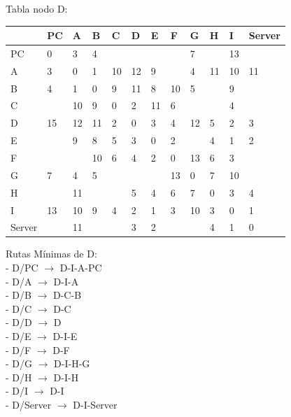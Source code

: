 \documentclass[a4paper]{article}
\begin{document}
\begin{table}[ht]
Tabla nodo D:\\
\begin{tabular}{|l|l|l|l|l|l|l|l|l|l|l|l|}
\hline
       & PC & A  & B & C & D & E & F & G & H & I  & Server \\ \hline
PC     & 0  & 3  & 4 &   &   &   &   & 7 &   & 13 &        \\ \hline
A      & 3  & 0  & 1 & 10& 12& 9 &   & 4 & 11& 10 & 11     \\ \hline
B      & 4  & 1  & 0 & 9 & 11& 8 & 10& 5 &   & 9  &        \\ \hline
C      &    & 10 & 9 & 0 & 2 & 11& 6 &   &   & 4  &        \\ \hline
D      & 15 & 12 & 11& 2 & 0 & 3 & 4 & 12& 5 & 2  & 3      \\ \hline
E      &    & 9  & 8 & 5 & 3 & 0 & 2 &   & 4 & 1  & 2      \\ \hline
F      &    &    & 10& 6 & 4 & 2 & 0 & 13& 6 & 3  &        \\ \hline
G      & 7  & 4  & 5 &   &   &   & 13& 0 & 7 & 10 &        \\ \hline
H      &    & 11 &   &   & 5 & 4 & 6 & 7 & 0 & 3  & 4      \\ \hline
I      & 13 & 10 & 9 & 4 & 2 & 1 & 3 & 10& 3 & 0  & 1      \\ \hline
Server &    & 11 &   &   & 3 & 2 &   &   & 4 & 1  & 0      \\ \hline
\end{tabular}

Rutas Mínimas de D:\\
-	D/PC  $\rightarrow$  D-I-A-PC\\
-	D/A  $\rightarrow$  D-I-A\\
-	D/B  $\rightarrow$  D-C-B\\
-	D/C  $\rightarrow$  D-C\\
-	D/D  $\rightarrow$  D\\
-	D/E  $\rightarrow$  D-I-E\\
-	D/F  $\rightarrow$  D-F\\
-	D/G  $\rightarrow$  D-I-H-G\\
-	D/H  $\rightarrow$  D-I-H\\
-	D/I  $\rightarrow$  D-I\\
-	D/Server  $\rightarrow$  D-I-Server\\
\end{table}

\clearpage
\end{document}
